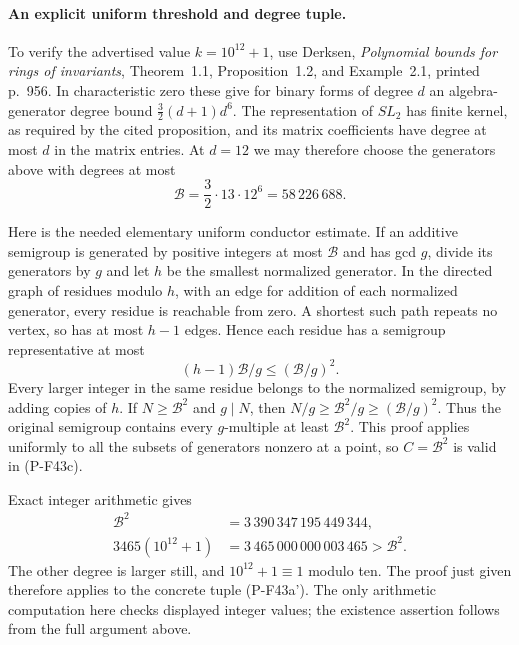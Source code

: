 \documentclass[11pt,a4paper]{article}
\begin{document}
\paragraph{An explicit uniform threshold and degree tuple.}
To verify the advertised value $k=10^{12}+1$, use Derksen,
\emph{Polynomial bounds for rings of invariants},
Theorem~1.1, Proposition~1.2, and Example~2.1, printed
p.~956. In characteristic zero these give for binary
forms of degree $d$ an algebra-generator degree bound
$\frac32(d+1)d^6$. The representation of $SL_2$ has finite
kernel, as required by the cited proposition, and its
matrix coefficients have degree at most $d$ in the
matrix entries. At $d=12$ we may therefore choose the
generators above with degrees at most
\[
              \mathcal B=\frac32\cdot13\cdot12^6
                        =58\,226\,688.
 \tag{P-F43h}
\]

Here is the needed elementary uniform conductor estimate.
If an additive semigroup is generated by positive integers
at most $\mathcal B$ and has gcd $g$, divide its generators
by $g$ and let $h$ be the smallest normalized generator.
In the directed graph of residues modulo $h$, with an
edge for addition of each normalized generator, every
residue is reachable from zero. A shortest such path
repeats no vertex, so has at most $h-1$ edges. Hence each
residue has a semigroup representative at most
\[
            (h-1)\mathcal B/g\le(\mathcal B/g)^2.
\]
Every larger integer in the same residue belongs to the
normalized semigroup, by adding copies of $h$.
If $N\ge\mathcal B^2$ and $g\mid N$, then
$N/g\ge\mathcal B^2/g\ge(\mathcal B/g)^2$.
Thus the original semigroup contains every $g$-multiple
at least $\mathcal B^2$. This proof applies uniformly to
all the subsets of generators nonzero at a point, so
$C=\mathcal B^2$ is valid in (P-F43c).

Exact integer arithmetic gives
\[
 \begin{split}
 \mathcal B^2&=3\,390\,347\,195\,449\,344,\\
 3465(10^{12}+1)&=3\,465\,000\,000\,003\,465
                        >\mathcal B^2.
 \end{split}
\]
The other degree is larger still, and $10^{12}+1\equiv1$
modulo ten. The proof just given therefore applies to
the concrete tuple (P-F43a'). The only arithmetic
computation here checks displayed integer values; the
existence assertion follows from the full argument above.
\end{document}
